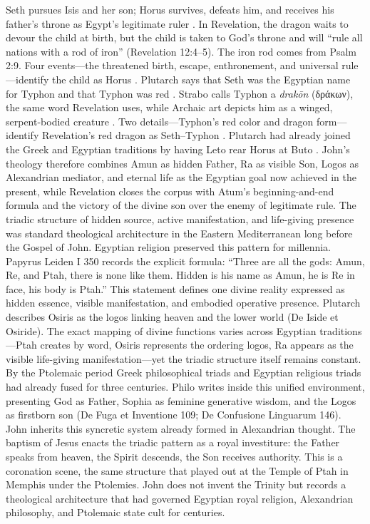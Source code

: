 Seth pursues Isis and her son; Horus survives, defeats him, and receives his father's throne as Egypt's legitimate ruler \cite[19]{plutarch:deiside}\cite[185--187]{henten:dragon-myth}.
In Revelation, the dragon waits to devour the child at birth, but the child is taken to God's throne and will ``rule all nations with a rod of iron'' (Revelation 12:4--5).
The iron rod comes from Psalm 2:9.
Four events---the threatened birth, escape, enthronement, and universal rule---identify the child as Horus \cite[185--187]{henten:dragon-myth}.
Plutarch says that Seth was the Egyptian name for Typhon and that Typhon was red \cite[22, 31, 49]{plutarch:deiside}.
Strabo calls Typhon a \emph{drakōn} (δράκων), the same word Revelation uses, while Archaic art depicts him as a winged, serpent-bodied creature \cite[16.2.7]{strabo:geography}\cite{bm:typhon}.
Two details---Typhon's red color and dragon form---identify Revelation's red dragon as Seth--Typhon \cite[185--187]{henten:dragon-myth}.
Plutarch had already joined the Greek and Egyptian traditions by having Leto rear Horus at Buto \cite[38]{plutarch:deiside}.
John's theology therefore combines Amun as hidden Father, Ra as visible Son, Logos as Alexandrian mediator, and eternal life as the Egyptian goal now achieved in the present, while Revelation closes the corpus with Atum's beginning-and-end formula and the victory of the divine son over the enemy of legitimate rule.
The triadic structure of hidden source, active manifestation, and life-giving presence was standard theological architecture in the Eastern Mediterranean long before the Gospel of John.
Egyptian religion preserved this pattern for millennia.
Papyrus Leiden I 350 records the explicit formula: ``Three are all the gods: Amun, Re, and Ptah, there is none like them. Hidden is his name as Amun, he is Re in face, his body is Ptah.''
This statement defines one divine reality expressed as hidden essence, visible manifestation, and embodied operative presence.
Plutarch describes Osiris as the logos linking heaven and the lower world (De Iside et Osiride).
The exact mapping of divine functions varies across Egyptian traditions---Ptah creates by word, Osiris represents the ordering logos, Ra appears as the visible life-giving manifestation---yet the triadic structure itself remains constant.
By the Ptolemaic period Greek philosophical triads and Egyptian religious triads had already fused for three centuries.
Philo writes inside this unified environment, presenting God as Father, Sophia as feminine generative wisdom, and the Logos as firstborn son (De Fuga et Inventione 109; De Confusione Linguarum 146).
John inherits this syncretic system already formed in Alexandrian thought.
The baptism of Jesus enacts the triadic pattern as a royal investiture: the Father speaks from heaven, the Spirit descends, the Son receives authority.
This is a coronation scene, the same structure that played out at the Temple of Ptah in Memphis under the Ptolemies.
John does not invent the Trinity but records a theological architecture that had governed Egyptian royal religion, Alexandrian philosophy, and Ptolemaic state cult for centuries.

